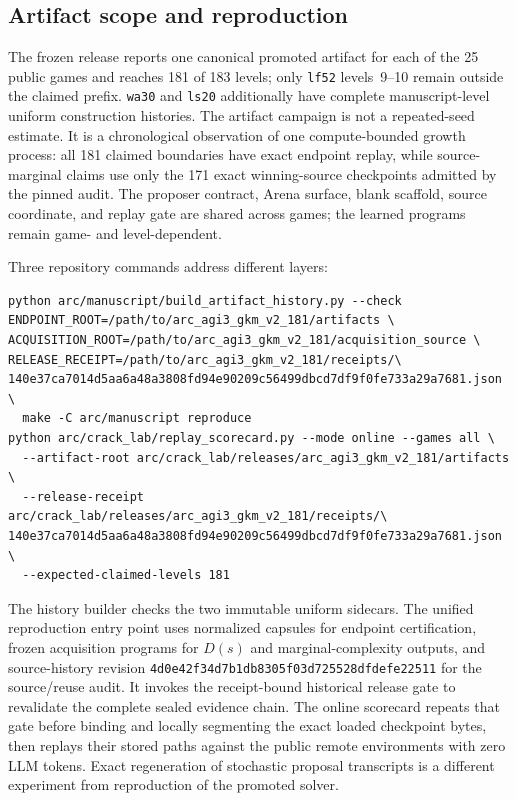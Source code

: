 \documentclass[11pt]{article}
\theoremstyle{definition}
\theoremstyle{remark}
\begin{document}
\subsection{Artifact scope and reproduction}
The frozen release reports one canonical promoted artifact for each of the 25 public
games and reaches 181 of 183 levels; only \texttt{lf52} levels~9--10 remain outside
the claimed prefix. \texttt{wa30} and \texttt{ls20} additionally have complete
manuscript-level uniform construction histories. The artifact campaign is not a
repeated-seed estimate. It is a chronological observation of one compute-bounded growth
process: all 181 claimed boundaries have exact endpoint replay, while source-marginal
claims use only the 171 exact winning-source checkpoints admitted by the pinned audit.
The proposer contract, Arena surface, blank scaffold, source coordinate, and replay
gate are shared across games; the learned programs remain game- and level-dependent.

Three repository commands address different layers:
\begin{verbatim}
python arc/manuscript/build_artifact_history.py --check
ENDPOINT_ROOT=/path/to/arc_agi3_gkm_v2_181/artifacts \
ACQUISITION_ROOT=/path/to/arc_agi3_gkm_v2_181/acquisition_source \
RELEASE_RECEIPT=/path/to/arc_agi3_gkm_v2_181/receipts/\
140e37ca7014d5aa6a48a3808fd94e90209c56499dbcd7df9f0fe733a29a7681.json \
  make -C arc/manuscript reproduce
python arc/crack_lab/replay_scorecard.py --mode online --games all \
  --artifact-root arc/crack_lab/releases/arc_agi3_gkm_v2_181/artifacts \
  --release-receipt arc/crack_lab/releases/arc_agi3_gkm_v2_181/receipts/\
140e37ca7014d5aa6a48a3808fd94e90209c56499dbcd7df9f0fe733a29a7681.json \
  --expected-claimed-levels 181
\end{verbatim}
The history builder checks the two immutable uniform sidecars. The unified reproduction
entry point uses normalized capsules for endpoint certification, frozen acquisition
programs for $D(s)$ and marginal-complexity outputs, and source-history revision
\texttt{4d0e42f34d7b1db8305f03d725528dfdefe22511} for the source/reuse audit.
It invokes the receipt-bound historical release gate to revalidate the complete sealed
evidence chain. The online
scorecard repeats that gate before binding and locally segmenting the exact loaded
checkpoint bytes, then replays their stored paths against the public remote environments
with zero LLM tokens. Exact regeneration of stochastic proposal transcripts is a
different experiment from reproduction of the promoted solver.
\end{document}
